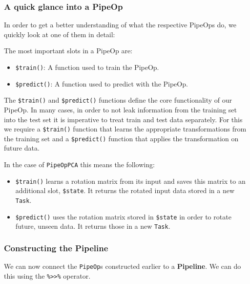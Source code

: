 \documentclass[]{scrbook}
\providecommand{\tightlist}{%
  \setlength{\itemsep}{0pt}\setlength{\parskip}{0pt}}
\begin{document}
\hypertarget{a-quick-glance-into-a-pipeop}{%
\subsubsection{A quick glance into a PipeOp}\label{a-quick-glance-into-a-pipeop}}

In order to get a better understanding of what the respective PipeOps do, we quickly look at one of them in detail:

The most important slots in a PipeOp are:

\begin{itemize}
\tightlist
\item
  \texttt{\$train()}: A function used to train the PipeOp.
\item
  \texttt{\$predict()}: A function used to predict with the PipeOp.
\end{itemize}

The \texttt{\$train()} and \texttt{\$predict()} functions define the core functionality of our PipeOp.
In many cases, in order to not leak information from the training set into the test set it is imperative to treat train and test data separately.
For this we require a \texttt{\$train()} function that learns the appropriate transformations from the training set and a \texttt{\$predict()} function that applies the transformation on future data.

In the case of \texttt{PipeOpPCA} this means the following:

\begin{itemize}
\tightlist
\item
  \texttt{\$train()} learns a rotation matrix from its input and saves this matrix to an additional slot, \texttt{\$state}.
  It returns the rotated input data stored in a new \texttt{Task}.
\item
  \texttt{\$predict()} uses the rotation matrix stored in \texttt{\$state} in order to rotate future, unseen data.
  It returns those in a new \texttt{Task}.
\end{itemize}

\hypertarget{constructing-the-pipeline}{%
\subsubsection{Constructing the Pipeline}\label{constructing-the-pipeline}}

We can now connect the \texttt{PipeOp}s constructed earlier to a \textbf{Pipeline}.
We can do this using the \texttt{\%\textgreater{}\textgreater{}\%} operator.
\end{document}
